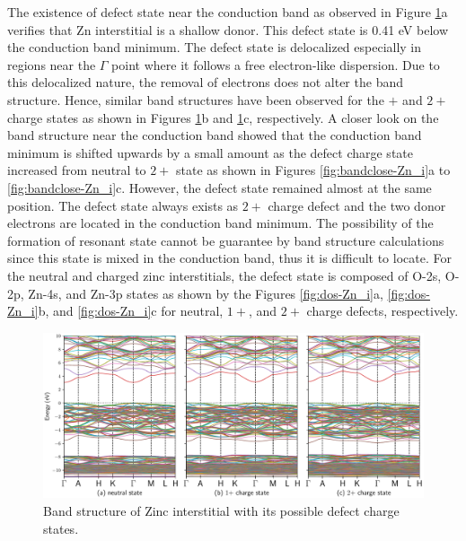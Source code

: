 The existence of defect state near the conduction band as observed in Figure \ref{fig:band-Zn_i}a verifies that Zn interstitial is a shallow donor. This defect state is 0.41 eV below the conduction band minimum.  The defect state is delocalized especially in regions near the $\Gamma$ point where it follows a free electron-like dispersion. Due to this delocalized nature, the  removal of electrons does not alter the band structure. Hence, similar band structures have been observed for the $+$ and $2+$ charge states as shown in Figures
\ref{fig:band-Zn_i}b and \ref{fig:band-Zn_i}c, respectively. 
A closer look on the band structure near the conduction band showed that the conduction band minimum is shifted upwards by a small amount as the defect charge state increased from neutral to $2+$ state as shown in Figures \ref{fig:bandclose-Zn_i}a to \ref{fig:bandclose-Zn_i}c. However, the defect state remained almost at the same position. The defect state always exists as $2+$ charge defect and the two donor electrons are located in the conduction band minimum. The possibility of the formation of resonant state cannot be guarantee by band structure calculations since this state is mixed in the conduction band, thus it is difficult to locate. For the neutral and charged zinc interstitials, the defect state is composed of O-2s, O-2p, Zn-4s, and Zn-3p states as shown by the Figures \ref{fig:dos-Zn_i}a, \ref{fig:dos-Zn_i}b, and \ref{fig:dos-Zn_i}c for neutral, $1+$, and $2+$ charge defects, respectively.

\begin{figure}[tbph!]
	\centering
	\includegraphics[width=1\textwidth]{"images/rnd/Zn_i-band"}
	\caption[Band structure of Zinc interstitial with its possible defect charge states]{Band structure of Zinc interstitial with its possible defect charge states. }
	\label{fig:band-Zn_i}
\end{figure}

